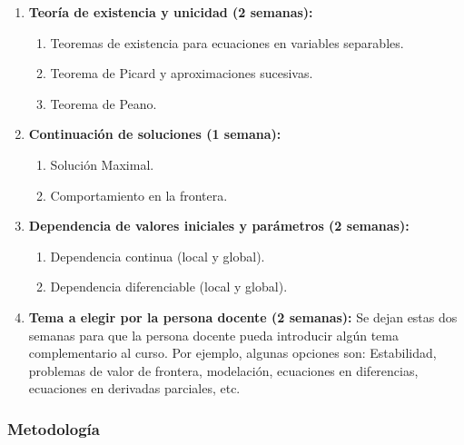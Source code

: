 \begin{refsection}
\begin{enumerate}
\begin{enumerate}
\end{enumerate}
\item \textbf{Teoría de existencia y unicidad (2 semanas):} 
\begin{enumerate}
    \item Teoremas de existencia para ecuaciones en variables separables. 
    \item Teorema de Picard y aproximaciones sucesivas.
    \item Teorema de Peano.
\end{enumerate}


\item \textbf{Continuación de soluciones (1 semana):} 
\begin{enumerate}
    \item Solución Maximal.
    \item Comportamiento en la frontera.
\end{enumerate}

\item \textbf{Dependencia de valores iniciales y parámetros (2 semanas):} 
\begin{enumerate}
    \item Dependencia continua (local y global).
    \item Dependencia diferenciable (local y global).
\end{enumerate}


\item \textbf{Tema a elegir por la persona docente (2 semanas):}
 Se dejan estas dos semanas para que la persona docente pueda introducir algún tema complementario al curso. Por ejemplo, algunas opciones son: Estabilidad, problemas de valor de frontera, modelación, ecuaciones en diferencias, ecuaciones en derivadas parciales, etc.


\end{enumerate}

\subsubsection*{Metodología}


\end{refsection}
